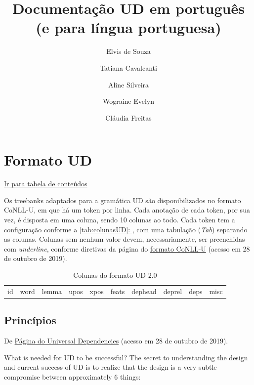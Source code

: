 \documentclass[output=paper,colorlinks,citecolor=brown]{langscibook}
\author{Elvis de Souza\affiliation{PUC-Rio, Brasil}\and Tatiana Cavalcanti\and Aline Silveira\and Wograine Evelyn\and Cláudia Freitas}
\title{Documentação UD em português\\
(e para língua portuguesa)}
\newcommand*{\fullref}[1]{\hyperref[{#1}]{\autoref*{#1}: \nameref*{#1}}} %
\begin{document}
\maketitle


\tableofcontents

\chapter{Formato UD}\label{sec:formatoud}

\hyperlink{toc}{Ir para tabela de conteúdos\\}

Os treebanks adaptados para a gramática UD são disponibilizados no formato CoNLL-U, em que há um token por linha. Cada anotação de cada token, por sua vez, é disposta em uma coluna, sendo 10 colunas ao todo. Cada token tem a configuração conforme a \fullref{tab:colunasUD}, com uma tabulação (\textit{Tab}) separando as colunas. Colunas sem nenhum valor devem, necessariamente, ser preenchidas com \textit{underline}, conforme diretivas da página do \href{https://universaldependencies.org/format}{formato CoNLL-U} (acesso em 28 de outubro de 2019).

\begin{table}
    \centering
    \begin{tabular}{c c c c c c c c c c}
        id & word & lemma & upos & xpos & feats & dephead & deprel & deps & misc\\
    \end{tabular}
    \caption{Colunas do formato UD 2.0}
    \label{tab:colunasUD}
\end{table}

\section{Princípios}\label{sec:principios}

	De \href{https://universaldependencies.org/introduction.html}{Página do Universal Dependencies} (acesso em 28 de outubro de 2019).
	
	What is needed for UD to be successful?
	The secret to understanding the design and current success of UD is to realize that the design is a very subtle compromise between approximately 6 things:
	
\end{document}
